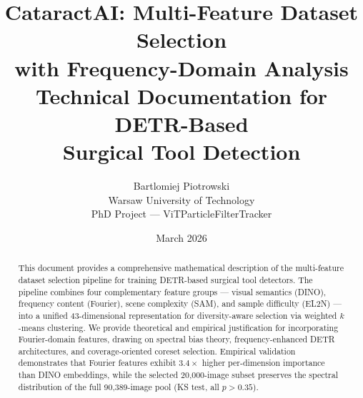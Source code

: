 \documentclass[11pt,a4paper]{article}
\title{\textbf{CataractAI: Multi-Feature Dataset Selection\\
       with Frequency-Domain Analysis}\\[0.5em]
       \large Technical Documentation for DETR-Based\\
       Surgical Tool Detection}
\author{Bartlomiej Piotrowski\\
        \small Warsaw University of Technology\\
        \small PhD Project --- ViTParticleFilterTracker}
\date{March 2026}
\begin{document}
\maketitle

\begin{abstract}
This document provides a comprehensive mathematical description of the
multi-feature dataset selection pipeline for training DETR-based surgical
tool detectors.  The pipeline combines four complementary feature groups
--- visual semantics (DINO), frequency content (Fourier), scene complexity
(SAM), and sample difficulty (EL2N) --- into a unified 43-dimensional
representation for diversity-aware selection via weighted $k$-means
clustering.  We provide theoretical and empirical justification for
incorporating Fourier-domain features, drawing on spectral bias theory,
frequency-enhanced DETR architectures, and coverage-oriented coreset
selection.  Empirical validation demonstrates that Fourier features exhibit
$3.4\times$ higher per-dimension importance than DINO embeddings, while the
selected 20,000-image subset preserves the spectral distribution of the
full 90,389-image pool (KS test, all $p > 0.35$).
\end{abstract}

\tableofcontents
\newpage



\newpage



\newpage


\end{document}
